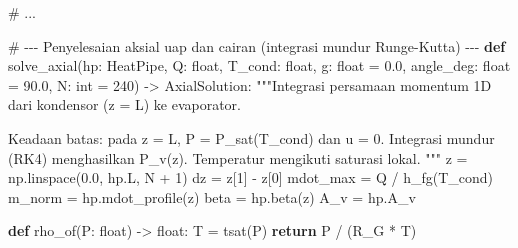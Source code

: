 \documentclass[
  indonesian,
  12pt,
  a4paper,
]{report}
\newenvironment{Shaded}{\begin{snugshade}}{\end{snugshade}}
\newcommand{\BuiltInTok}[1]{\textcolor[rgb]{0.00,0.23,0.31}{#1}}
\newcommand{\CommentTok}[1]{\textcolor[rgb]{0.37,0.37,0.37}{#1}}
\newcommand{\ControlFlowTok}[1]{\textcolor[rgb]{0.00,0.23,0.31}{\textbf{#1}}}
\newcommand{\DecValTok}[1]{\textcolor[rgb]{0.68,0.00,0.00}{#1}}
\newcommand{\FloatTok}[1]{\textcolor[rgb]{0.68,0.00,0.00}{#1}}
\newcommand{\KeywordTok}[1]{\textcolor[rgb]{0.00,0.23,0.31}{\textbf{#1}}}
\newcommand{\NormalTok}[1]{\textcolor[rgb]{0.00,0.23,0.31}{#1}}
\newcommand{\OperatorTok}[1]{\textcolor[rgb]{0.37,0.37,0.37}{#1}}
\begin{document}
\begin{Shaded}
\begin{Highlighting}[]
\CommentTok{\# ...}

\CommentTok{\# {-}{-}{-} Penyelesaian aksial uap dan cairan (integrasi mundur Runge{-}Kutta) {-}{-}{-}}
\KeywordTok{def}\NormalTok{ solve\_axial(hp: HeatPipe, Q: }\BuiltInTok{float}\NormalTok{, T\_cond: }\BuiltInTok{float}\NormalTok{, g: }\BuiltInTok{float} \OperatorTok{=} \FloatTok{0.0}\NormalTok{,}
\NormalTok{                angle\_deg: }\BuiltInTok{float} \OperatorTok{=} \FloatTok{90.0}\NormalTok{, N: }\BuiltInTok{int} \OperatorTok{=} \DecValTok{240}\NormalTok{) }\OperatorTok{{-}\textgreater{}}\NormalTok{ AxialSolution:}
    \CommentTok{"""Integrasi persamaan momentum 1D dari kondensor (z = L) ke evaporator.}

\CommentTok{    Keadaan batas: pada z = L, P = P\_sat(T\_cond) dan u = 0. Integrasi}
\CommentTok{    mundur (RK4) menghasilkan P\_v(z). Temperatur mengikuti saturasi lokal.}
\CommentTok{    """}
\NormalTok{    z }\OperatorTok{=}\NormalTok{ np.linspace(}\FloatTok{0.0}\NormalTok{, hp.L, N }\OperatorTok{+} \DecValTok{1}\NormalTok{)}
\NormalTok{    dz }\OperatorTok{=}\NormalTok{ z[}\DecValTok{1}\NormalTok{] }\OperatorTok{{-}}\NormalTok{ z[}\DecValTok{0}\NormalTok{]}
\NormalTok{    mdot\_max }\OperatorTok{=}\NormalTok{ Q }\OperatorTok{/}\NormalTok{ h\_fg(T\_cond)}
\NormalTok{    m\_norm }\OperatorTok{=}\NormalTok{ hp.mdot\_profile(z)}
\NormalTok{    beta }\OperatorTok{=}\NormalTok{ hp.beta(z)}
\NormalTok{    A\_v }\OperatorTok{=}\NormalTok{ hp.A\_v}

    \KeywordTok{def}\NormalTok{ rho\_of(P: }\BuiltInTok{float}\NormalTok{) }\OperatorTok{{-}\textgreater{}} \BuiltInTok{float}\NormalTok{:}
\NormalTok{        T }\OperatorTok{=}\NormalTok{ tsat(P)}
        \ControlFlowTok{return}\NormalTok{ P }\OperatorTok{/}\NormalTok{ (R\_G }\OperatorTok{*}\NormalTok{ T)}


\end{Highlighting}
\end{Shaded}
\end{document}
